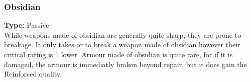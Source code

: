 \subsubsection{Obsidian}
\label{iqty:obsidian}
\textbf{Type:} Passive\\
While weapons made of obsidian are generally quite sharp, they are prone to breakage.
It only takes \threat\threat\threat or \despair to break a weapon made of obsidian
however their critical rating is 1 lower. Armour made of obsidian is quite rare, for
if it is damaged, the armour is immediatly broken beyond repair, but it does gain
the Reinforced quality.
